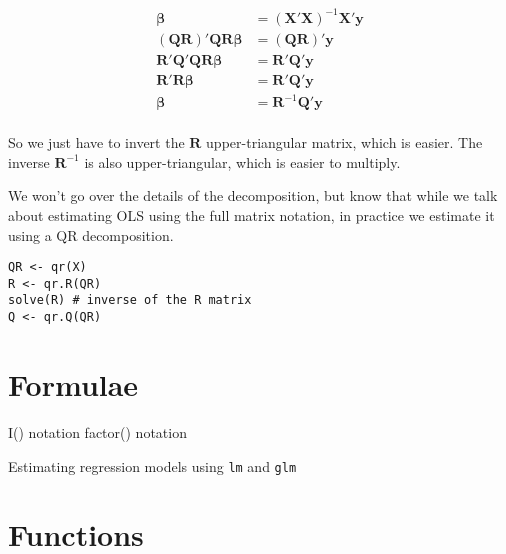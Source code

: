 \documentclass[a4paper,12pt]{article}
\newcommand{\matr}[1]{\mathbf{#1}}
\begin{document}
\begin{align*}
\matr{\beta} & = (\matr{X}'\matr{X})^{-1}\matr{X}'\matr{y} \\
(\matr{Q}\matr{R})'\matr{Q}\matr{R}\matr{\beta} & = (\matr{Q}\matr{R})'\matr{y} \\
\matr{R}'\matr{Q}'\matr{Q}\matr{R}\matr{\beta} & = \matr{R}'\matr{Q}'\matr{y} \\
\matr{R}'\matr{R}\matr{\beta} & = \matr{R}'\matr{Q}'\matr{y} \\
\matr{\beta} & = \matr{R}^{-1}\matr{Q}'\matr{y}\\
\end{align*}

So we just have to invert the $\matr{R}$ upper-triangular matrix, which is easier. The inverse $\matr{R}^{-1}$ is also upper-triangular, which is easier to multiply.

We won't go over the details of the decomposition, but know that while we talk about estimating OLS using the full matrix notation, in practice we estimate it using a QR decomposition.


\begin{lstlisting}
QR <- qr(X)
R <- qr.R(QR)
solve(R) # inverse of the R matrix
Q <- qr.Q(QR)
\end{lstlisting}






\clearpage
\section{Formulae}


I() notation
factor() notation


Estimating regression models using \texttt{lm} and \texttt{glm}



\clearpage
\section{Functions}
\end{document}
